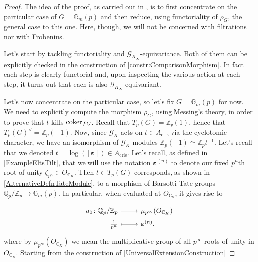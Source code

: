 \begin{proof}
	The idea of the proof, as carried out in \cite[\S6]{Faltings},
	is to first concentrate on the particular case of $G = \mathbb{G}_m(p)$
	and then reduce, using functoriality of $\rho_G$, the general case to this one.
	Here, though, we will not be concerned with filtrations nor with Frobenius.

	Let's start by tackling functoriality and $\mathscr{G}_{K_\infty}$-equivariance.
	Both of them can be explicitly checked in the construction of 
	\cref{constr:ComparisonMorphism}.
	In fact each step is clearly functorial
	and, upon inspecting the various action at each step, it turns out
	that each is also $\mathscr{G}_{K_\infty}$-equivariant.

	Let's now concentrate on the particular case, so let's fix $G = \mathbb{G}_m(p)$ for now.
	We need to explicitly compute the morphism $\rho_G$, using Messing's theory,
	in order to prove that $t$ kills $\operatorname{coker} \rho_G$.
	Recall that $T_p(G) = \mathbb{Z}_{p}(1)$, hence that $T_p(G)^\vee = \mathbb{Z}_{p}(-1)$.
	Now, since $\mathscr{G}_{K}$ acts on $t \in A_{\mathrm{cris}}$ via the cyclotomic
	character, we have an isomorphism of $\mathscr{G}_{K}$-modules $\mathbb{Z}_{p}(-1)
	\simeq \mathbb{Z}_{p} t^{-1}$.
	Let's recall that we denoted $t = \log([\boldsymbol\varepsilon]) \in A_{\mathrm{cris}}$.
	Let's recall, as defined in \cref{ExampleEltsTilt}, that we will use
	the notation $\boldsymbol\varepsilon^{(n)}$ to denote
	our fixed $p^n$th root of unity $\zeta_{p^n} \in O_{\mathbb{C}_K}$,
	Then $t \in T_p(G)$ corresponds, as shown in \cref{AlternativeDefnTateModule},
	to a morphism of Barsotti-Tate groups $\underline{\mathbb{Q}_p/\mathbb{Z}_{p}} \to \mathbb{G}_m(p)$.
	In particular, when evaluated at $O_{\mathbb{C}_K}$, it gives rise to
	\begin{equation*}
	\begin{tikzcd}[row sep = 0ex
		,/tikz/column 1/.append style={anchor=base east}
		,/tikz/column 2/.append style={anchor=base west}]
		u_0\colon 
		\mathbb{Q}_p/\mathbb{Z}_{p}
		\arrow[r, "", rightarrow] &
		\mu_{p^\infty}(O_{\mathbb{C}_K}) \\
		\frac{ 1 }{ p^n } \arrow[r, "", mapsto] & 
		\boldsymbol\varepsilon^{(n)}
	,\end{tikzcd}
	\end{equation*} 
	where by $\mu_{p^\infty}(O_{\mathbb{C}_K})$ we mean the multiplicative group
	of all $p^\infty$ roots of unity in $O_{\mathbb{C}_K}$.
	Starting from the construction of \cref{UniversalExtensionConstruction} 

\end{proof}
